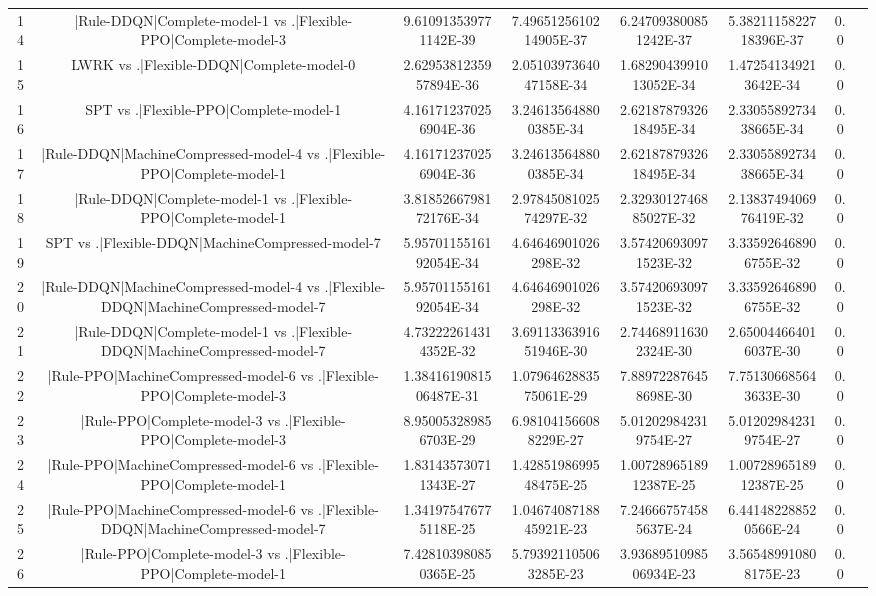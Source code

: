\documentclass[a3paper,10pt]{article}
\begin{document}
\begin{table}[!htp]
\begin{tabular}{cccccccc}
14&|Rule-DDQN|Complete-model-1 vs .|Flexible-PPO|Complete-model-3&9.610913539771142E-39&7.4965125610214905E-37&6.247093800851242E-37&5.3821115822718396E-37&0.0\\
15&LWRK vs .|Flexible-DDQN|Complete-model-0&2.6295381235957894E-36&2.0510397364047158E-34&1.6829043991013052E-34&1.472541349213642E-34&0.0\\
16&SPT vs .|Flexible-PPO|Complete-model-1&4.161712370256904E-36&3.246135648800385E-34&2.6218787932618495E-34&2.3305589273438665E-34&0.0\\
17&|Rule-DDQN|MachineCompressed-model-4 vs .|Flexible-PPO|Complete-model-1&4.161712370256904E-36&3.246135648800385E-34&2.6218787932618495E-34&2.3305589273438665E-34&0.0\\
18&|Rule-DDQN|Complete-model-1 vs .|Flexible-PPO|Complete-model-1&3.8185266798172176E-34&2.9784508102574297E-32&2.3293012746885027E-32&2.1383749406976419E-32&0.0\\
19&SPT vs .|Flexible-DDQN|MachineCompressed-model-7&5.9570115516192054E-34&4.64646901026298E-32&3.574206930971523E-32&3.335926468906755E-32&0.0\\
20&|Rule-DDQN|MachineCompressed-model-4 vs .|Flexible-DDQN|MachineCompressed-model-7&5.9570115516192054E-34&4.64646901026298E-32&3.574206930971523E-32&3.335926468906755E-32&0.0\\
21&|Rule-DDQN|Complete-model-1 vs .|Flexible-DDQN|MachineCompressed-model-7&4.732222614314352E-32&3.6911336391651946E-30&2.744689116302324E-30&2.650044664016037E-30&0.0\\
22&|Rule-PPO|MachineCompressed-model-6 vs .|Flexible-PPO|Complete-model-3&1.3841619081506487E-31&1.0796462883575061E-29&7.889722876458698E-30&7.751306685643633E-30&0.0\\
23&|Rule-PPO|Complete-model-3 vs .|Flexible-PPO|Complete-model-3&8.950053289856703E-29&6.981041566088229E-27&5.012029842319754E-27&5.012029842319754E-27&0.0\\
24&|Rule-PPO|MachineCompressed-model-6 vs .|Flexible-PPO|Complete-model-1&1.831435730711343E-27&1.4285198699548475E-25&1.0072896518912387E-25&1.0072896518912387E-25&0.0\\
25&|Rule-PPO|MachineCompressed-model-6 vs .|Flexible-DDQN|MachineCompressed-model-7&1.341975476775118E-25&1.0467408718845921E-23&7.246667574585637E-24&6.441482288520566E-24&0.0\\
26&|Rule-PPO|Complete-model-3 vs .|Flexible-PPO|Complete-model-1&7.428103980850365E-25&5.793921105063285E-23&3.9368951098506934E-23&3.565489910808175E-23&0.0\\

\end{tabular}
\end{table}
\end{document}
